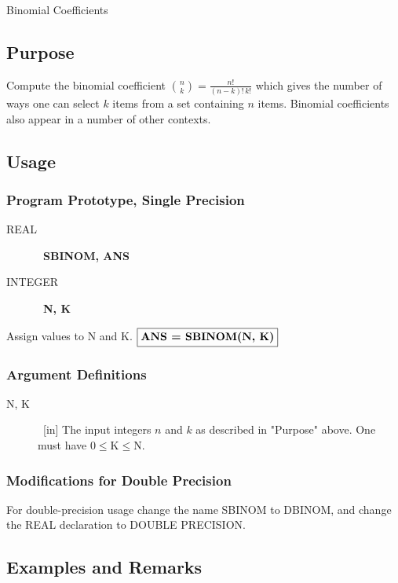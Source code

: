 \documentclass[twoside]{MATH77}
\begin{document}
  Binomial Coefficients


\subsection{Purpose}

Compute the binomial coefficient $\displaystyle \binom{n}{k} =
\frac{n!}{(n-k)!\, k!}$ which gives the number of ways one can select
$k$ items from a set containing $n$ items.  Binomial coefficients also
appear in a number of other contexts.

\subsection{Usage}

\subsubsection{Program Prototype, Single Precision}
\begin{description}
\item[REAL] \ {\bf SBINOM, ANS}
\item[INTEGER] \ {\bf N, K}
\end{description}
Assign values to N and K.
$
\fbox{\bf ANS = SBINOM(N, K)}
$

\subsubsection{Argument Definitions}

\begin{description}
\item[N, K] \ [in] The input integers $n$ and $k$ as described in
"Purpose" above.  One must have $0 \leq \text{K} \leq \text{N}.$
\end{description}

\subsubsection{Modifications for Double Precision}

For double-precision usage change the name SBINOM to DBINOM, and
change the REAL declaration to DOUBLE PRECISION.

\subsection{Examples and Remarks}
\end{document}
